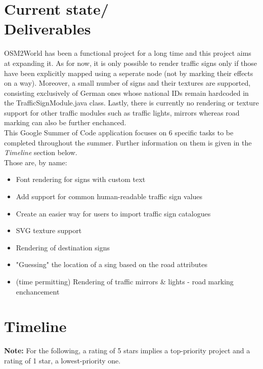 \documentclass[margin,line]{res}
\begin{document}
\begin{resume}
\section{\sc \textbf{Current state/ } \\ \textbf{Deliverables}}
OSM2World has been a functional project for a long time and this project aims at
expanding it. As for now, it is only possible to render traffic signs only if those have been explicitly mapped using a seperate node (not by marking their effects on a way). Moreover, a small number of signs and their textures are supported, consisting exclusively of German ones whose national IDs remain hardcoded in the TrafficSignModule.java class. Lastly, there is currently no
rendering or texture support for other traffic modules such as traffic lights, mirrors whereas road marking can also be further enchanced. \\
This Google Summer of Code application focuses on 6 specific tasks to be completed throughout the summer. Further information on them is given in the \textit{Timeline} section below. \\
Those are, by name:
\begin{itemize}
\item Font rendering for signs with custom text
\item Add support for common human-readable traffic sign values
\item Create an easier way for users to import traffic sign catalogues
\item SVG texture support
\item Rendering of destination signs
\item "Guessing" the location of a sing based on the road attributes
\item (time permitting) Rendering of traffic mirrors \& lights - road marking enchancement
\end{itemize}

\section{\sc \textbf{Timeline}}
\textbf{Note: } For the following, a rating of 5 stars implies a top-priority project and a rating of 1 star, a lowest-priority one.


\end{resume}
\end{document}
